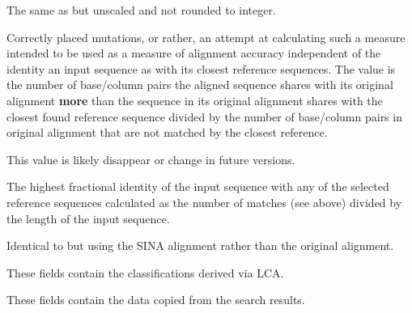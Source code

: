 \documentclass[english,a4paper]{article}
\begin{document}
\begin{Description}
\item[\Arg{bps}]
  The same as  but unscaled and not rounded to integer.
\item[\Arg{cpm}]
  Correctly placed mutations, or rather, an attempt at calculating such a measure
  intended to be used as a measure of alignment accuracy independent of the 
  identity an input sequence as with its closest reference sequences. 
  The value is the number of base/column pairs the aligned sequence
  shares with its original alignment \textbf{more} than the sequence in its 
  original alignment shares with the closest found reference sequence divided by
  the number of base/column pairs in original alignment that are not matched 
  by the closest reference.

  This value is likely disappear or change in future versions. 
\item[\Arg{idty}]
  The highest fractional identity of the input sequence with any of the 
  selected reference sequences calculated as the number of matches (see above)
  divided by the length of the input sequence.
\item[\Arg{achieved\_idty}]
  Identical to  but using the SINA alignment rather than the original
  alignment. 
\item[\Arg{lca\_*}]
  These fields contain the classifications derived via LCA.
\item[\Arg{copy\_*}]
  These fields contain the data copied from the search results.
\end{Description}
\end{document}
